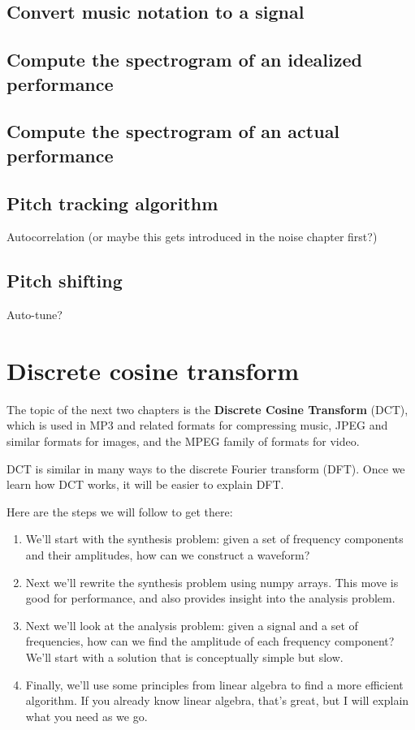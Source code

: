 \documentclass[12pt]{book}
\begin{document}
\section{Convert music notation to a signal}

\section{Compute the spectrogram of an idealized performance}

\section{Compute the spectrogram of an actual performance}

\section{Pitch tracking algorithm}

Autocorrelation (or maybe this gets introduced in the noise chapter first?)

\section{Pitch shifting}

Auto-tune?


\chapter{Discrete cosine transform}

The topic of the next two chapters is the {\bf Discrete Cosine
  Transform} (DCT), which is used in MP3 and related formats for
compressing music, JPEG and similar formats for images, and the MPEG
family of formats for video.

DCT is similar in many ways to the discrete Fourier transform (DFT).
Once we learn how DCT works, it will be easier to explain DFT.

Here are the steps we will follow to get there:

\begin{enumerate}

\item We'll start with the synthesis problem: given a set of frequency
  components and their amplitudes, how can we construct a waveform?

\item Next we'll rewrite the synthesis problem using numpy arrays.
  This move is good for performance, and also provides insight
  into the analysis problem.

\item Next we'll look at the analysis problem: given a signal and a
  set of frequencies, how can we find the amplitude of each frequency
  component?  We'll start with a solution that is conceptually simple
  but slow.

\item Finally, we'll use some principles from linear algebra to find a
  more efficient algorithm.  If you already know linear algebra,
  that's great, but I will explain what you need as we go.

\end{enumerate}
\end{document}
